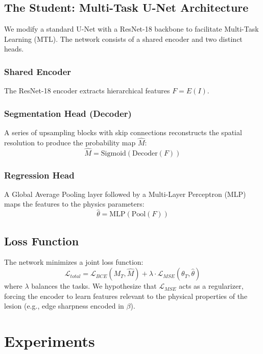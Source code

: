 \documentclass[journal]{IEEEtran}
\begin{document}
\subsection{The Student: Multi-Task U-Net Architecture}
We modify a standard U-Net with a ResNet-18 backbone to facilitate Multi-Task Learning (MTL). The network consists of a shared encoder and two distinct heads.

\subsubsection{Shared Encoder}
The ResNet-18 encoder extracts hierarchical features $F = E(I)$.

\subsubsection{Segmentation Head (Decoder)}
A series of upsampling blocks with skip connections reconstructs the spatial resolution to produce the probability map $\hat{M}$:
\begin{equation}
\hat{M} = \text{Sigmoid}(\text{Decoder}(F))
\end{equation}

\subsubsection{Regression Head}
A Global Average Pooling layer followed by a Multi-Layer Perceptron (MLP) maps the features to the physics parameters:
\begin{equation}
\hat{\theta} = \text{MLP}(\text{Pool}(F))
\end{equation}

\subsection{Loss Function}
The network minimizes a joint loss function:
\begin{equation}
\mathcal{L}_{total} = \mathcal{L}_{BCE}(M_T, \hat{M}) + \lambda \cdot \mathcal{L}_{MSE}(\theta_T, \hat{\theta})
\end{equation}
where $\lambda$ balances the tasks. We hypothesize that $\mathcal{L}_{MSE}$ acts as a regularizer, forcing the encoder to learn features relevant to the physical properties of the lesion (e.g., edge sharpness encoded in $\beta$).

\section{Experiments}
\end{document}

